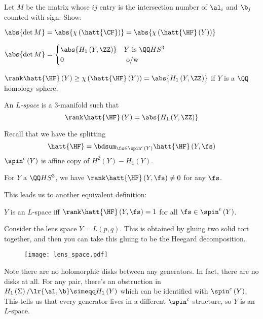 \documentclass{amsart}
\begin{document}
\begin{exr}
Let $M$ be the matrix whose $ij$ entry is 
the intersection number of $\al_i$ and $\b_j$ counted with sign. Show:
\begin{qenum}
\item $\abs{\det M} = \abs{\chi\left( \hatt{\CF} \right)} =
\abs{\chi\left( \hatt{\HF}\left( Y \right) \right)}$
\item 
$\abs{\det M} = 
\begin{cases}
\abs{H_1\left( Y, \ZZ \right)} 
& Y \text{ is } \QQ HS^3\\
0 & \text{ o/w }
\end{cases}
$
\end{qenum}
\end{exr}

\begin{cor}
$\rank \hatt{\HF}\left( Y \right) \geq \chi\left( \hatt{\HF}\left( Y \right) \right) = 
\abs{H_1\left( Y , \ZZ \right)}$ if $Y$ is a $\QQ$ homology sphere.
\end{cor}

\begin{defn}
An \emph{$L$-space} is a $3$-manifold such that
\begin{equation}
\rank \hatt{\HF}\left( Y \right)= \abs{H_1\left( Y , \ZZ \right)}
\end{equation}
\end{defn}

Recall that we have the splitting
\begin{equation}
\hatt{\HF} = 
\bdsum_{\fs\in \spin^c\left( Y \right)} 
\hatt{\HF}\left( Y , \fs \right)
\end{equation}
$\spin^c \left( Y \right)$ is affine copy of $H^2\left( Y \right) - H_1\left( Y \right)$. 

\begin{prop}
For $Y$ a $\QQ HS^3$, we have $\rank \hatt{\HF}\left( Y , \fs \right)\neq 0$
for any $\fs$.
\end{prop}

This leads us to another equivalent definition:

\begin{thm}
$Y$ is an $L$-space iff
$\rank \hatt{\HF}\left( Y , \fs \right) = 1$
for all $\fs\in \spin^c\left( Y \right)$.
\end{thm}

\begin{exm}
Consider the lens space $Y = L\left( p , q \right)$.
This is obtained by gluing two solid tori together, and then
you can take this gluing to be the Heegard decomposition.
\begin{figure}
\texttt{[image: lens\_space.pdf]}
\end{figure}
Note there are no holomorphic disks between any generators.
In fact, there are no disks at all. For any pair, there's an obstruction in 
$H_1\left( \Sigma \right) / \lr{\al , \b}\simeqq H_1\left( Y  \right)$ which can
be identified with $\spin^c\left( Y \right)$. 
This tells us that every generator lives in a different $\spin^c$ structure, so $Y$ is
an $L$-space.
\end{exm}
\end{document}
